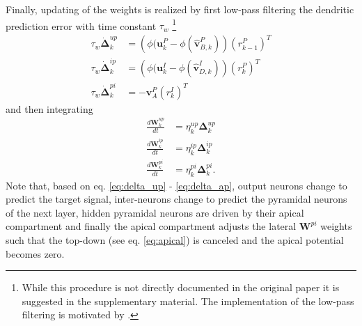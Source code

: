 \documentclass[12pt,a4paper]{article}
\begin{document}
Finally, updating of the weights is realized by first low-pass filtering the dendritic prediction error with time constant $\tau_w$ \footnote{While this procedure is not directly documented in the original paper it is suggested in the supplementary material. The implementation of the low-pass filtering is motivated by \cite{urb_senn}.}
\begin{align}
\tau_w\dot{\bm{\Delta}}^{up}_k &= \left(\phi(\bm{u}^P_k - \phi(\hat{\bm{v}}^P_{B,k})\right)(r^P_{k-1})^T\label{eq:delta_up}\\
\tau_w\dot{\bm{\Delta}}^{ip}_k &= \left(\phi(\bm{u}^I_k - \phi(\hat{\bm{v}}^I_{D,k})\right)(r^P_{k})^T\\
\tau_w\dot{\bm{\Delta}}^{pi}_k &= -\bm{v}^P_A(r^I_{k})^T \label{eq:delta_ap}
\end{align}
and then integrating
\begin{align}
\frac{d\bm{W}^{up}_k}{dt} &= \eta^{up}_k\bm{\Delta}^{up}_k \\
\frac{d\bm{W}^{ip}_k}{dt} &= \eta^{ip}_k\bm{\Delta}^{ip}_k \\
\frac{d\bm{W}^{pi}_k}{dt} &= \eta^{pi}_k\bm{\Delta}^{pi}_k. \label{eq:W_pi}
\end{align}
Note that, based on eq. \eqref{eq:delta_up} - \eqref{eq:delta_ap}, output neurons change to predict the target signal, inter-neurons change to predict the pyramidal neurons of the next layer, hidden pyramidal neurons are driven by their apical compartment and finally the apical compartment adjusts the lateral $\bm{W}^{pi}$ weights such that the top-down (see eq. \eqref{eq:apical}) is canceled and the apical potential becomes zero.\\
\end{document}
